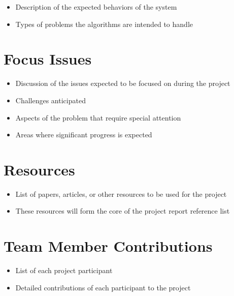 \documentclass{article}
\begin{document}
\begin{itemize}
    \item Description of the expected behaviors of the system
    \item Types of problems the algorithms are intended to handle
\end{itemize}

\section{Focus Issues}

\begin{itemize}
    \item Discussion of the issues expected to be focused on during the project
    \item Challenges anticipated
    \item Aspects of the problem that require special attention
    \item Areas where significant progress is expected
\end{itemize}

\section{Resources}

\begin{itemize}
    \item List of papers, articles, or other resources to be used for the
          project
    \item These resources will form the core of the project report reference
          list
\end{itemize}

\section{Team Member Contributions}

\begin{itemize}
    \item List of each project participant
    \item Detailed contributions of each participant to the project
\end{itemize}
\end{document}
